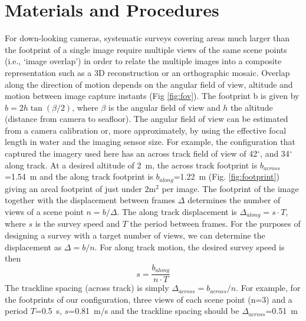 \section{Materials and Procedures}
\label{sec:MandP}


For down-looking cameras, systematic surveys covering areas much larger than the footprint of a single image require multiple views of the same scene points (i.e., `image overlap') in order to relate the multiple images into a composite representation such as a 3D reconstruction or an orthographic mosaic. Overlap along the direction of motion depends on the angular field of view, altitude and motion between image capture instants (Fig \ref{fig:fov}). The footprint b is given by $b = 2 h \tan(\beta/2)$, where $\beta$ is the angular field of view and $h$ the altitude (distance from camera to seafloor). The angular field of view can be estimated from a camera calibration \cite{bouguet2004camera} or, more approximately, by using the effective focal length in water and the imaging sensor size. For example, the configuration that captured the imagery used here has an across track field of view of 42$^\circ$, and 34$^\circ$ along track. At a desired altitude of 2~m, the across track footprint is $b_{across}$=1.54~m and the along track footprint is $b_{along}$=1.22~m (Fig. \ref{fig:footprint}) giving an areal footprint of just under 2m$^2$ per image. 
The footprint of the image together with the displacement between frames $\Delta$ determines the number of views of a scene point $n = b/\Delta$. The along track displacement is $\Delta_{along} = s \cdot T$, where $s$ is the survey speed and $T$ the period between frames. 
For the purposes of designing a survey with a target number of views, we can determine the displacement as $\Delta = b/n$. For along track motion, the desired survey speed is then
\begin{equation}
s = \frac{b_{along}}{n \cdot T}
\end{equation}
The trackline spacing (across track) is simply $\Delta_{across} = b_{across}/n$.
For example, for the footprints of our configuration, three views of each scene point (n=3) and a period $T$=0.5~s, $s$=0.81~m/s and the trackline spacing should be $\Delta_{across}$=0.51~m


